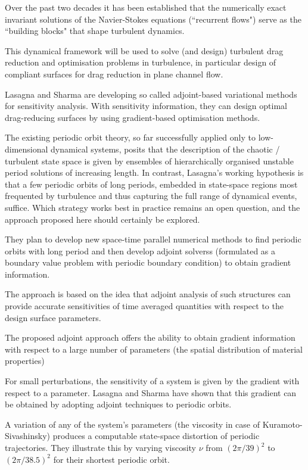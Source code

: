 Over the past two decades it has been established that the
numerically exact invariant solutions of the Navier-Stokes
equations (``recurrent flows") serve as the ``building blocks" that
shape turbulent dynamics.

This dynamical framework  will be used to solve (and design) turbulent drag
reduction and optimisation problems in turbulence, in particular design of
compliant surfaces for drag reduction in plane channel flow.

Lasagna and Sharma are developing so called adjoint-based variational methods for
sensitivity analysis. With sensitivity information, they can design optimal
drag-reducing surfaces by using gradient-based optimisation methods.

The existing periodic orbit theory, so far successfully applied
only to low-dimensional dynamical systems, posits that the
description of the chaotic / turbulent state space is given by
ensembles of hierarchically organised unstable period solutions of
increasing length.
In contrast, Lasagna's working hypothesis is that a few periodic orbits of long
periods, embedded in state-space regions most frequented by turbulence and thus
capturing the full range of dynamical events, suffice. Which strategy works best
in practice remains an open question, and the approach proposed here should
certainly be explored.

They plan to develop new space-time parallel numerical methods to
find periodic orbits with long period and then develop adjoint
solverss
(formulated as a boundary value problem with periodic boundary condition)
to obtain gradient information.

The approach is based on the idea that adjoint analysis of such
structures can provide accurate sensitivities of time averaged
quantities with respect to the design surface parameters.


The proposed adjoint approach offers the ability to obtain
gradient information
with respect to a large number of parameters (the spatial
distribution of material properties)

For small perturbations, the sensitivity of a system is given by
the gradient with respect to a parameter.
Lasagna and Sharma have shown that this gradient can be obtained by
adopting adjoint techniques to periodic orbits.

A variation of any of the system's parameters (the viscosity in
case of {Kuramoto-Sivashinsky}) produces a computable state-space
distortion of periodic trajectories. They illustrate this by
varying viscosity $\nu$ from $(2\pi/39)^2$ to $(2\pi/38.5)^2$
for their shortest periodic orbit.

